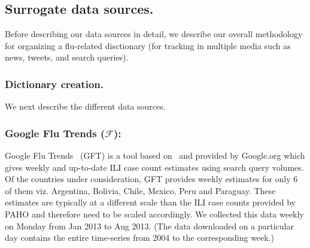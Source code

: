 

\subsection{Surrogate data sources.} Before
describing our data sources in detail, we describe our overall methodology
for organizing a flu-related disctionary (for tracking in multiple media such
as news, tweets, and search queries).

\subsubsection{\label{sec:keyword} Dictionary creation.} 

We next describe the different data sources.

\subsubsection{Google Flu Trends ($\mathcal{F}$):}
Google Flu Trends~\cite{GFT:2013} (GFT) is a tool based
on~\cite{ginsberg2008detecting} and provided by Google.org which gives weekly
and up-to-date ILI case count estimates using search query volumes. 
Of the countries under
consideration, GFT provides weekly estimates for only 6 of them viz.  Argentina,
Bolivia, Chile, Mexico, Peru and Paraguay. 
These estimates are typically at
a different scale than the ILI case counts provided by PAHO and therefore need
to be scaled accordingly.  We collected this data weekly on Monday from Jan
2013 to Aug 2013. (The data downloaded on a particular day contains the entire
time-series from 2004 to the corresponding week.)
 
